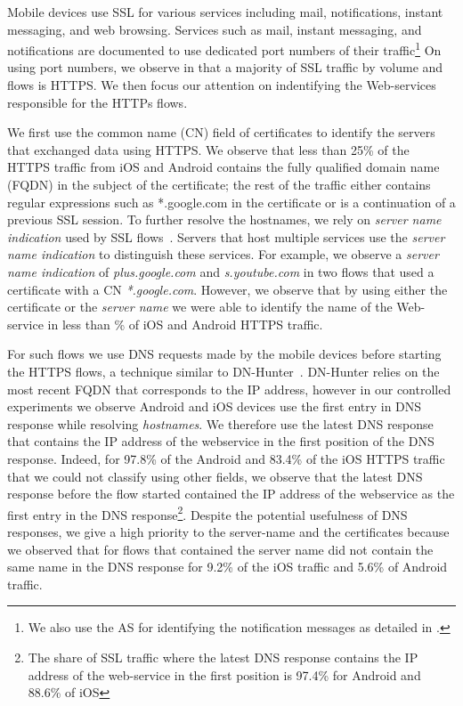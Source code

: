 Mobile devices use SSL for various services including mail, notifications, instant messaging, and web browsing.
Services such as mail, instant messaging, and notifications are documented to use dedicated port numbers of their traffic\footnote{We also use the AS for identifying the notification messages as detailed in .}
On using port numbers, we observe in  that a majority of SSL traffic by volume and flows is HTTPS.
We then focus our attention on indentifying the Web-services responsible for the HTTPs flows. 

We first use the common name (CN) field of certificates to identify the servers that exchanged data using HTTPS.
We observe that less than 25\% of the HTTPS traffic from iOS and Android contains the fully qualified domain name (FQDN) in the subject of the certificate; the rest of the traffic either contains regular expressions such as *.google.com in the certificate or is a continuation of a previous SSL session. 
To further resolve the hostnames, we rely on \emph{server name indication} used by SSL flows~\cite{rfc:servernametls}.
Servers that host multiple services use the \emph{server name indication} to distinguish these services.   
For example, we observe a \emph{server name indication} of \emph{plus.google.com} and \emph{s.youtube.com} in two flows that used a certificate with a CN \emph{*.google.com}.
However, we observe that by using either the certificate or the \emph{server name} we were able to identify the name of the Web-service in less than \% of iOS and Android HTTPS traffic.

For such flows we use DNS requests made by the mobile devices before starting the HTTPS flows, a technique similar to DN-Hunter~\cite{bermudez:dnhunter}.
DN-Hunter relies on the most recent FQDN that corresponds to the IP address, however in our controlled experiments we observe Android and iOS devices use the first entry in DNS response while resolving \emph{hostnames}.
We therefore use the latest DNS response that contains the IP address of the webservice in the first position of the DNS response. 
Indeed, for 97.8\% of the Android and 83.4\% of the iOS HTTPS traffic that we could not classify using other fields, we observe that the latest DNS response before the flow started contained the IP address of the webservice as the first entry in the DNS response\footnote{The share of SSL traffic where the latest DNS response contains the IP address of the web-service in the first position is 97.4\% for Android and 88.6\% of iOS}. 
Despite the potential usefulness of DNS responses, we give a high priority to the server-name and the certificates because we observed that for flows that contained the server name did not contain the same name in the DNS response for 9.2\% of the iOS traffic and 5.6\% of Android traffic.

